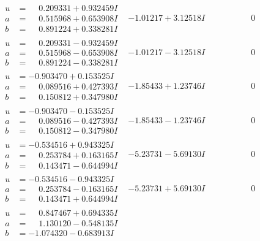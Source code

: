 \documentclass[1p]{elsarticle_modified}
\theoremstyle{definition}
\begin{document}
$$\begin{array}{c|c|c}
\begin{aligned}
u &= \phantom{-}0.209331 + 0.932459 I \\
a &= \phantom{-}0.515968 + 0.653908 I \\
b &= \phantom{-}0.891224 + 0.338281 I\end{aligned}
 & -1.01217 + 3.12518 I & \phantom{-0.000000 } 0 \\ \hline\begin{aligned}
u &= \phantom{-}0.209331 - 0.932459 I \\
a &= \phantom{-}0.515968 - 0.653908 I \\
b &= \phantom{-}0.891224 - 0.338281 I\end{aligned}
 & -1.01217 - 3.12518 I & \phantom{-0.000000 } 0 \\ \hline\begin{aligned}
u &= -0.903470 + 0.153525 I \\
a &= \phantom{-}0.089516 + 0.427393 I \\
b &= \phantom{-}0.150812 + 0.347980 I\end{aligned}
 & -1.85433 + 1.23746 I & \phantom{-0.000000 } 0 \\ \hline\begin{aligned}
u &= -0.903470 - 0.153525 I \\
a &= \phantom{-}0.089516 - 0.427393 I \\
b &= \phantom{-}0.150812 - 0.347980 I\end{aligned}
 & -1.85433 - 1.23746 I & \phantom{-0.000000 } 0 \\ \hline\begin{aligned}
u &= -0.534516 + 0.943325 I \\
a &= \phantom{-}0.253784 + 0.163165 I \\
b &= \phantom{-}0.143471 - 0.644994 I\end{aligned}
 & -5.23731 - 5.69130 I & \phantom{-0.000000 } 0 \\ \hline\begin{aligned}
u &= -0.534516 - 0.943325 I \\
a &= \phantom{-}0.253784 - 0.163165 I \\
b &= \phantom{-}0.143471 + 0.644994 I\end{aligned}
 & -5.23731 + 5.69130 I & \phantom{-0.000000 } 0 \\ \hline\begin{aligned}
u &= \phantom{-}0.847467 + 0.694335 I \\
a &= \phantom{-}1.130120 - 0.548135 I \\
b &= -1.074320 - 0.683913 I\end{aligned}

\end{array}$$
\end{document}
